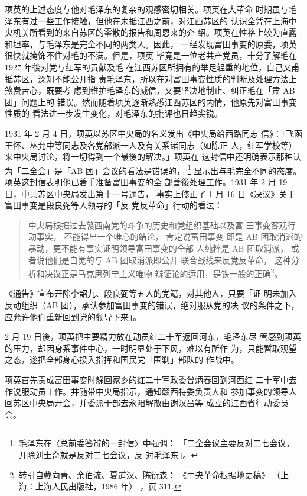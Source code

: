 项英的上述态度与他对毛泽东的复杂的观感密切相关。项英在大革命
时期虽与毛泽东有过一些工作接触，但他在未抵江西之前，对江西苏区的
认识全凭在上海中央机关所看到的来自苏区的零散的报告和周恩来的介
绍。项英在性格上较为直露和坦率，与毛泽东是完全不同的两类人。因此，
一经发现富田事变的原委，项英很快就掩饰不住对毛的不满。但是，项英
毕竟是一位老共产党员，十分了解毛在 1927 年後对党与红军的贡献及毛
在江西苏区所拥有的举足轻重的地位，自己又甫抵苏区，深知不能公开指
责毛泽东，所以在对富田事变性质的判断及处理方法上煞费苦心，既要考
虑到维护毛泽东的威信，又要坚决地制止、纠正毛在「肃 AB 团」问题上的
错误。然而随着项英逐渐熟悉江西苏区的内情，他原先对富田事变性质的
看法进一步发生变化，对毛泽东的批评也日趋尖锐。

1931 年 2 月 4 日，项英以苏区中央局的名义发出《中央局给西路同志
信》：「飞函王怀、丛允中等同志及各党部派一人及有关系诸同志（如陈正
人，红军学校等）来中央局讨论，将一切得到一个最後的解决。」项英在
这封信中还明确表示那种认为「二全会」是「AB 团」会议的看法是错误的，
\footnote{ 毛泽东在〈总前委答辩的一封信〉中强调：
「二全会议主要反对二七会议，开除刘士奇就是反对二七会议，反
对毛泽东」。}
显示出与毛完全不同的态度。
项英这封信表明他已着手准备富田事变的全
部善後处理工作。1931 年 2 月 19 日，中共苏区中央局发出第十一号通告，
事实上修正了 1 月 16 日《决议》关于富田事变是段良弼等人领导的「反
党反革命」行动的看法：
\begin{quote}
	\fzwkai 中央局根据过去赣西南党的斗争的历史和党组织基础以及富
田事变客观行动事实，
不能得出一个唯心的结论，
肯定说富田事变
即是 AB 团取消派的暴动，更不能有事实证明领导富田事变的全部
人纯粹是 AB 团取消派，
或者说他们是自觉的与 AB 团取消派即公开
联合战线来反党反革命，
这种分析和决议正是马克思列宁主义唯物
辩证论的运用，是铁一般的正确\footnote{ 转引自戴向青、余伯流、夏道汉、陈衍森：
《中央革命根据地史稿》
（上海：上海人民出版社，1986 年）
，页 311.}。
\end{quote}

《通告》宣布开除李韶九、段良弼等五人的党籍，对其他人，只要「证
明未加入反动组织（AB 团），承认参加富田事变的错误，绝对服从党的决
议的条件之下，应允许他们重新回到党的领导下来」。

2 月 19 日後，项英把主要精力放在动员红二十军返回河东，毛泽东尽
管感到项英的压力，却因身系事件中心，一时明显处于下风，难以有所作
为，只能暂取观望之态，遂把全部身心投入指挥和国民党「围剿」部队的
作战中。

项英首先责成富田事变时躲回家乡的红二十军政委曾炳春回到河西红
二十军中去作说服动员工作。并随带中央局指示，通知赣西特委负责人和
参加事变的领导人回苏区中央局开会，并委派干部去永阳解散由谢汉昌等
成立的江西省行动委员会。

